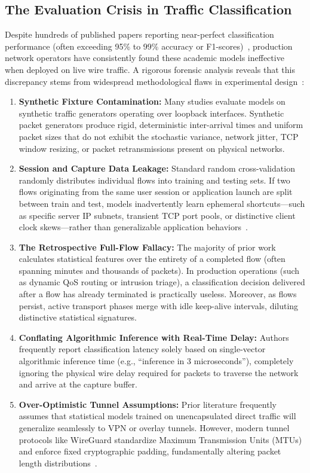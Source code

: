 \documentclass[conference]{IEEEtran}
\begin{document}
\subsection{The Evaluation Crisis in Traffic Classification}
Despite hundreds of published papers reporting near-perfect classification performance (often exceeding 95\% to 99\% accuracy or F1-scores)~\cite{lotfollahi2020deep,wang2017end,lin2022etbert}, production network operators have consistently found these academic models ineffective when deployed on live wire traffic. A rigorous forensic analysis reveals that this discrepancy stems from widespread methodological flaws in experimental design~\cite{arp2022dos,pendlebury2019tesseract,sommer2010outside}:
\begin{enumerate}
    \item \textbf{Synthetic Fixture Contamination:} Many studies evaluate models on synthetic traffic generators operating over loopback interfaces. Synthetic packet generators produce rigid, deterministic inter-arrival times and uniform packet sizes that do not exhibit the stochastic variance, network jitter, TCP window resizing, or packet retransmissions present on physical networks.
    \item \textbf{Session and Capture Data Leakage:} Standard random cross-validation randomly distributes individual flows into training and testing sets. If two flows originating from the same user session or application launch are split between train and test, models inadvertently learn ephemeral shortcuts---such as specific server IP subnets, transient TCP port pools, or distinctive client clock skews---rather than generalizable application behaviors~\cite{arp2022dos,pendlebury2019tesseract}.
    \item \textbf{The Retrospective Full-Flow Fallacy:} The majority of prior work calculates statistical features over the entirety of a completed flow (often spanning minutes and thousands of packets). In production operations (such as dynamic QoS routing or intrusion triage), a classification decision delivered after a flow has already terminated is practically useless. Moreover, as flows persist, active transport phases merge with idle keep-alive intervals, diluting distinctive statistical signatures.
    \item \textbf{Conflating Algorithmic Inference with Real-Time Delay:} Authors frequently report classification latency solely based on single-vector algorithmic inference time (e.g., ``inference in 3 microseconds''), completely ignoring the physical wire delay required for packets to traverse the network and arrive at the capture buffer.
    \item \textbf{Over-Optimistic Tunnel Assumptions:} Prior literature frequently assumes that statistical models trained on unencapsulated direct traffic will generalize seamlessly to VPN or overlay tunnels. However, modern tunnel protocols like WireGuard standardize Maximum Transmission Units (MTUs) and enforce fixed cryptographic padding, fundamentally altering packet length distributions~\cite{donenfeld2017wireguard}.
\end{enumerate}
\end{document}
